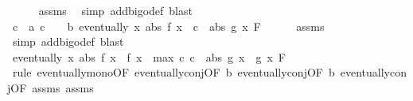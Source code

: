\begin{isabellebody}
\ \ \ \ \isamarkupfalse%
\ assms{\isacharparenleft}{\kern0pt}{}{\isacharparenright}{\kern0pt}\ \isamarkupfalse%
\ {\isacharparenleft}{\kern0pt}simp\ add{\isacharcolon}{\kern0pt}bigo{\isacharunderscore}{\kern0pt}def{\isacharcomma}{\kern0pt}\ blast{\isacharparenright}{\kern0pt}\isanewline
\ \ \isamarkupfalse%
\ c{}\ \ a{}{\isacharcolon}{\kern0pt}\ {\isachardoublequoteopen}c{}\ {\isachargreater}{\kern0pt}\ {}{\isachardoublequoteclose}\ \ b{}{\isacharcolon}{\kern0pt}\ {\isachardoublequoteopen}eventually\ {\isacharparenleft}{\kern0pt}{\isasymlambda}x{\isachardot}{\kern0pt}\ abs\ {\isacharparenleft}{\kern0pt}f{}\ x{\isacharparenright}{\kern0pt}\ {\isasymle}\ c{}\ {\isacharasterisk}{\kern0pt}\ abs\ {\isacharparenleft}{\kern0pt}g{}\ x{\isacharparenright}{\kern0pt}{\isacharparenright}{\kern0pt}\ F{\isacharprime}{\kern0pt}{\isachardoublequoteclose}\isanewline
\ \ \ \ \isamarkupfalse%
\ assms{\isacharparenleft}{\kern0pt}{}{\isacharparenright}{\kern0pt}\ \isamarkupfalse%
\ {\isacharparenleft}{\kern0pt}simp\ add{\isacharcolon}{\kern0pt}bigo{\isacharunderscore}{\kern0pt}def{\isacharcomma}{\kern0pt}\ blast{\isacharparenright}{\kern0pt}\isanewline
\ \ \isamarkupfalse%
\ {\isachardoublequoteopen}eventually\ {\isacharparenleft}{\kern0pt}{\isasymlambda}x{\isachardot}{\kern0pt}\ abs\ {\isacharparenleft}{\kern0pt}f{}\ x\ {\isacharplus}{\kern0pt}\ f{}\ x{\isacharparenright}{\kern0pt}\ {\isasymle}\ {\isacharparenleft}{\kern0pt}max\ c{}\ c{}{\isacharparenright}{\kern0pt}\ {\isacharasterisk}{\kern0pt}\ abs\ {\isacharparenleft}{\kern0pt}g{}\ x\ {\isacharplus}{\kern0pt}\ g{}\ x{\isacharparenright}{\kern0pt}{\isacharparenright}{\kern0pt}\ F{\isacharprime}{\kern0pt}{\isachardoublequoteclose}\isanewline
\ \ \isamarkupfalse%
\ {\isacharparenleft}{\kern0pt}rule\ eventually{\isacharunderscore}{\kern0pt}mono{\isacharbrackleft}{\kern0pt}OF\ eventually{\isacharunderscore}{\kern0pt}conj{\isacharbrackleft}{\kern0pt}OF\ b{}\ eventually{\isacharunderscore}{\kern0pt}conj{\isacharbrackleft}{\kern0pt}OF\ b{}\ eventually{\isacharunderscore}{\kern0pt}conj{\isacharbrackleft}{\kern0pt}OF\ assms{\isacharparenleft}{\kern0pt}{}{\isacharparenright}{\kern0pt}\ assms{\isacharparenleft}{\kern0pt}{}{\isacharparenright}{\kern0pt}{\isacharbrackright}{\kern0pt}{\isacharbrackright}{\kern0pt}{\isacharbrackright}{\kern0pt}{\isacharbrackright}{\kern0pt}{\isacharparenright}{\kern0pt}\isanewline

\end{isabellebody}
